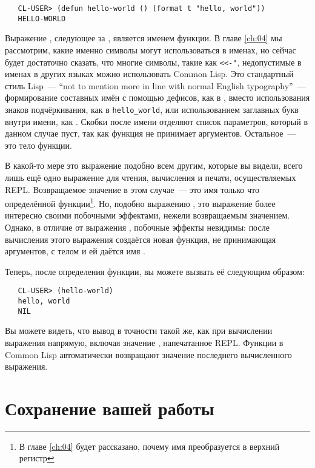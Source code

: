 \begin{verbatim}
   CL-USER> (defun hello-world () (format t "hello, world"))
   HELLO-WORLD
\end{verbatim}

Выражение , следующее за , является именем функции. В главе \ref{ch:04} мы
рассмотрим, какие именно символы могут использоваться в именах, но сейчас будет достаточно
сказать, что многие символы, такие как \lstinline|<<-"|, недопустимые в именах в других
языках можно использовать Common Lisp. Это стандартный стиль Lisp~--- ``not to mention more
in line with normal English typography''~--- формирование составных имён с помощью дефисов,
как в , вместо использования знаков подчёркивания, как в \lstinline|hello_world|, или
использованием заглавных букв внутри имени, как . Скобки \code{()} после имени отделяют
список параметров, который в данном случае пуст, так как функция не принимает
аргументов. Остальное~--- это тело функции.

В какой-то мере это выражение подобно всем другим, которые вы видели, всего лишь ещё одно
выражение для чтения, вычисления и печати, осуществляемых REPL. Возвращаемое значение в
этом случае~--- это имя только что определённой функции\footnote{В главе \ref{ch:04} будет рассказано,
  почему имя преобразуется в верхний регистр}. Но, подобно выражению , это выражение
более интересно своими побочными эффектами, нежели возвращаемым значением. Однако, в
отличие от выражения , побочные эффекты невидимы: после вычисления этого выражения
создаётся новая функция, не принимающая аргументов, с телом  и ей даётся имя .

Теперь, после определения функции, вы можете вызвать её следующим образом:

\begin{verbatim}
   CL-USER> (hello-world)
   hello, world
   NIL
\end{verbatim}

Вы можете видеть, что вывод в точности такой же, как при вычислении выражения 
напрямую, включая значение , напечатанное REPL. Функции в Common Lisp автоматически
возвращают значение последнего вычисленного выражения.

\section{Сохранение вашей работы}

